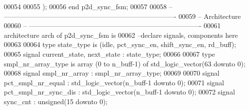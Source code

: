 \begin{DoxyCode}
00054       
00055         \textcolor{vhdlchar}{)};
00056 \textcolor{keywordflow}{end} \textcolor{vhdlchar}{p2d\_sync\_fsm};
00057 
00058 \textcolor{keyword}{-- ----------------------------------------------------------------------------}
00059 \textcolor{keyword}{-- Architecture}
00060 \textcolor{keyword}{-- ----------------------------------------------------------------------------}
00061 \textcolor{keywordflow}{architecture} arch \textcolor{keywordflow}{of} p2d_sync_fsm is
00062 \textcolor{keyword}{--declare signals,  components here}
00063 
00064 \textcolor{keywordflow}{type} \textcolor{vhdlchar}{state_type} \textcolor{keywordflow}{is} \textcolor{vhdlchar}{(}\textcolor{vhdlchar}{idle}\textcolor{vhdlchar}{,} \textcolor{vhdlchar}{pct\_sync\_en}\textcolor{vhdlchar}{,} \textcolor{vhdlchar}{shift\_sync\_en}\textcolor{vhdlchar}{,} \textcolor{vhdlchar}{rd\_buff}\textcolor{vhdlchar}{)};
00065 \textcolor{keywordflow}{signal} \textcolor{vhdlchar}{current_state}\textcolor{vhdlchar}{,} \textcolor{vhdlchar}{next_state} \textcolor{vhdlchar}{:} \textcolor{vhdlchar}{state_type}; 
00066 
00067 \textcolor{keywordflow}{type} \textcolor{vhdlchar}{smpl_nr_array_type}  \textcolor{keywordflow}{is} \textcolor{keywordflow}{array} \textcolor{vhdlchar}{(}\textcolor{vhdllogic}{}\textcolor{vhdllogic}{0} \textcolor{keywordflow}{to} \textcolor{vhdlchar}{n_buff}\textcolor{vhdlchar}{-}\textcolor{vhdllogic}{}\textcolor{vhdllogic}{1}\textcolor{vhdlchar}{)} \textcolor{keywordflow}{of} \textcolor{comment}{std\_logic\_vector}\textcolor{vhdlchar}{(}\textcolor{vhdllogic}{}\textcolor{vhdllogic}{63} \textcolor{keywordflow}{downto} \textcolor{vhdllogic}{}\textcolor{vhdllogic}{0}\textcolor{vhdlchar}{)};  
00068 \textcolor{keywordflow}{signal} \textcolor{vhdlchar}{smpl_nr_array}       \textcolor{vhdlchar}{:} \textcolor{vhdlchar}{smpl_nr_array_type};
00069 
00070 \textcolor{keywordflow}{signal} \textcolor{vhdlchar}{pct_smpl_nr_equal}      \textcolor{vhdlchar}{:} \textcolor{comment}{std\_logic\_vector}\textcolor{vhdlchar}{(}\textcolor{vhdlchar}{n_buff}\textcolor{vhdlchar}{-}\textcolor{vhdllogic}{}\textcolor{vhdllogic}{1} \textcolor{keywordflow}{downto} \textcolor{vhdllogic}{}\textcolor{vhdllogic}{0}\textcolor{vhdlchar}{)};
00071 \textcolor{keywordflow}{signal} \textcolor{vhdlchar}{pct_smpl_nr_sync_dis}   \textcolor{vhdlchar}{:} \textcolor{comment}{std\_logic\_vector}\textcolor{vhdlchar}{(}\textcolor{vhdlchar}{n_buff}\textcolor{vhdlchar}{-}\textcolor{vhdllogic}{}\textcolor{vhdllogic}{1} \textcolor{keywordflow}{downto} \textcolor{vhdllogic}{}\textcolor{vhdllogic}{0}\textcolor{vhdlchar}{)};
00072 \textcolor{keywordflow}{signal} \textcolor{vhdlchar}{sync_cnt}               \textcolor{vhdlchar}{:} \textcolor{comment}{unsigned}\textcolor{vhdlchar}{(}\textcolor{vhdllogic}{}\textcolor{vhdllogic}{15} \textcolor{keywordflow}{downto} \textcolor{vhdllogic}{}\textcolor{vhdllogic}{0}\textcolor{vhdlchar}{)};

\end{DoxyCode}
